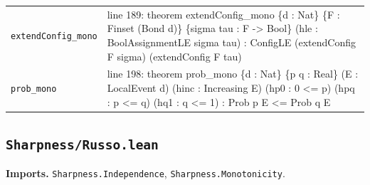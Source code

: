 \documentclass[10pt]{article}
\newcommand{\module}[1]{\texttt{#1}}
\begin{document}
\begin{longtable}{>{\raggedright\arraybackslash}p{} >{\raggedright\arraybackslash}p{}}
\texttt{extendConfig\_\allowbreak{}mono} & {\ttfamily\scriptsize line 189:\allowbreak{} theorem extendConfig\_\allowbreak{}mono \{d :\allowbreak{} Nat\} \{F :\allowbreak{} Finset (\allowbreak{}Bond d)\allowbreak{}\} \{sigma tau :\allowbreak{} F -\allowbreak{}> Bool\} (\allowbreak{}hle :\allowbreak{} BoolAssignmentLE sigma tau)\allowbreak{} :\allowbreak{} ConfigLE (\allowbreak{}extendConfig F sigma)\allowbreak{} (\allowbreak{}extendConfig F tau)\allowbreak{}} \\[0.45em]
\texttt{prob\_\allowbreak{}mono} & {\ttfamily\scriptsize line 198:\allowbreak{} theorem prob\_\allowbreak{}mono \{d :\allowbreak{} Nat\} \{p q :\allowbreak{} Real\} (\allowbreak{}E :\allowbreak{} LocalEvent d)\allowbreak{} (\allowbreak{}hinc :\allowbreak{} Increasing E)\allowbreak{} (\allowbreak{}hp0 :\allowbreak{} 0 <=\allowbreak{} p)\allowbreak{} (\allowbreak{}hpq :\allowbreak{} p <=\allowbreak{} q)\allowbreak{} (\allowbreak{}hq1 :\allowbreak{} q <=\allowbreak{} 1)\allowbreak{} :\allowbreak{} Prob p E <=\allowbreak{} Prob q E} \\[0.45em]
\end{longtable}

\subsection*{\module{Sharpness/Russo.lean}}
\textbf{Imports.} \module{Sharpness.Independence}, \module{Sharpness.Monotonicity}.
\end{document}
